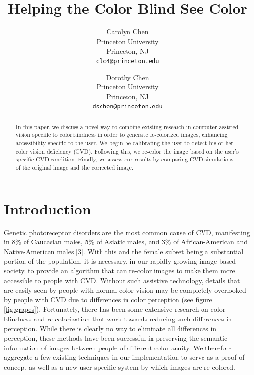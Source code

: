 \documentclass[10pt,twocolumn,letterpaper]{article}
\begin{document}
\title{Helping the Color Blind See Color}

\author{Carolyn Chen\\
Princeton University\\
Princeton, NJ\\
{\tt\small clc4@princeton.edu}
\and
Dorothy Chen\\
Princeton University\\
Princeton, NJ\\
{\tt\small dschen@princeton.edu}
}

\maketitle

\begin{abstract}
   In this paper, we discuss a novel way to combine existing research in computer-assisted vision specific to colorblindness in order to generate re-colorized images, enhancing accessibility specific to the user. We begin be calibrating the user to detect his or her color vision deficiency (CVD). Following this, we re-color the image based on the user’s specific CVD condition. Finally, we assess our results by comparing CVD simulations of the original image and the corrected image. 
\end{abstract}

\section{Introduction}

	Genetic photoreceptor disorders are the most common cause of CVD, manifesting in 8\% of Caucasian males, 5\% of Asiatic males, and 3\% of African-American and Native-American males [3]. With this and the female subset being a substantial portion of the population, it is necessary, in our rapidly growing image-based society, to provide an algorithm that can re-color images to make them more accessible to people with CVD. Without such assistive technology, details that are easily seen by people with normal color vision may be completely overlooked by people with CVD due to differences in color perception (see figure \ref{fig:grapes}). Fortunately, there has been some extensive research on color blindness and re-colorization that work towards reducing such differences in perception. While there is clearly no way to eliminate all differences in perception, these methods have been successful in preserving the semantic information of images between people of different color acuity. We therefore aggregate a few existing techniques in our implementation to serve as a proof of concept as well as a new user-specific system by which images are re-colored.
\end{document}
